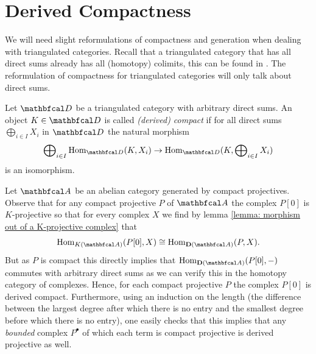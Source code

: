 \section{Derived Compactness}

We will need slight reformulations of compactness and generation when dealing with triangulated categories. Recall that a triangulated category that has all direct sums already has all (homotopy) colimits, this can be found in \cite[\href{https://stacks.math.columbia.edu/tag/0A5K}{Tag 0A5K}]{stacks-project}. The reformulation of compactness for triangulated categories will only talk about direct sums. 
\begin{definition}
	
	Let $\category{D}$ be a triangulated category with arbitrary direct sums. An object $K\in \category{D}$ is called \emph{(derived) compact} if for all direct sums $\bigoplus_{i \in I} X_i$ in $\category{D}$ the natural morphism
	$$\bigoplus\nolimits_{i\in I} \Hom_\category{D}(K, X_i) \to \Hom_\category{D}(K, \bigoplus\nolimits_{i\in I} X_i)$$
	is an isomorphism.
\end{definition}

\begin{example}
	\label{example: bounded complexes of compact projectives are derived compact}
	
	Let $\category{A}$ be an  abelian category generated by compact projectives. Observe that for any compact projective $P$ of $\category{A}$ the complex $P[0]$ is $K$-projective so that for every complex $X$ we find by lemma \ref{lemma: morphism out of a K-projective complex} that
		$$\Hom_\homotopyCategoryOfComplexes{\category{A}}(P[0], X)\cong \Hom_\derived{\category{A}}(P, X).$$
	But as $P$ is compact this directly implies that $\Hom_\derived{\category{A}}(P[0], -)$ commutes with arbitrary direct sums as we can verify this in the homotopy category of complexes. Hence, for each compact projective $P$ the complex $P[0]$ is derived compact. Furthermore, using an induction on the length (the difference between the largest degree after which there is no entry and the smallest degree before which there is no entry), one easily checks that this implies that any \emph{bounded} complex $P^\bullet$ of which each term is compact projective is derived projective as well.
\end{example}

